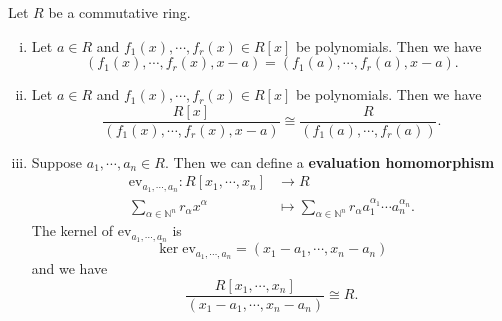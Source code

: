 \begin{corollary}{}{}
    Let $R$ be a commutative ring.
    \begin{enumerate}[(i)]
        \item Let $a\in R$ and $f_1(x),\cdots, f_r(x)\in R[x]$ be polynomials. Then we have
        \[
        (f_1(x),\cdots,f_r(x),x-a)=(f_1(a),\cdots,f_r(a),x-a).
        \]
        \item Let $a\in R$ and $f_1(x),\cdots, f_r(x)\in R[x]$ be polynomials. Then we have 
    \[
        \frac{R[x]}{(f_1(x),\cdots,f_r(x),x-a)}\cong \frac{R}{\left(f_1(a),\cdots,f_r(a) \right)}.
    \]
    \item Suppose $a_1,\cdots,a_n\in R$. Then we can define a \textbf{evaluation homomorphism} 
    \begin{align*}
        \mathrm{ev}_{a_1,\cdots,a_n}:R[x_1,\cdots,x_n]&\longrightarrow R\\
        \sum_{\alpha\in\mathbb{N}^n}r_\alpha x^\alpha&\longmapsto \sum_{\alpha\in\mathbb{N}^n}r_\alpha a_1^{\alpha_1}\cdots a_n^{\alpha_n}.
    \end{align*}
    The kernel of $\mathrm{ev}_{a_1,\cdots,a_n}$ is 
    \[
    \ker \mathrm{ev}_{a_1,\cdots,a_n}=(x_1-a_1,\cdots,x_n-a_n)
    \]
    and we have
    \[
    \frac{R[x_1,\cdots,x_n]}{(x_1-a_1,\cdots,x_n-a_n)}\cong R.
    \]
    \end{enumerate}
    
    
\end{corollary}
